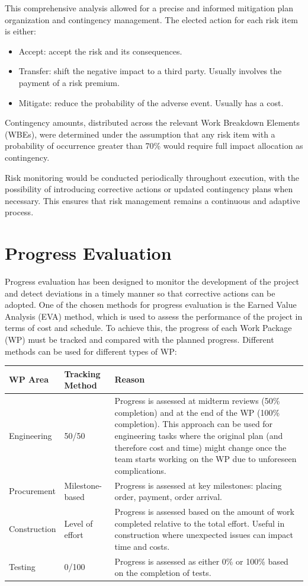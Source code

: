 This comprehensive analysis allowed for a precise and informed mitigation plan organization and contingency management.
The elected action for each risk item is either:
\begin{itemize}
    \item Accept: accept the risk and its consequences.
    \item Transfer: shift the negative impact to a third party. Usually involves the payment of a risk premium.
    \item Mitigate: reduce the probability of the adverse event. Usually has a cost.
\end{itemize}

Contingency amounts, distributed across the relevant Work Breakdown Elements (WBEs), were determined under the assumption that any risk item with a probability of occurrence greater than 70\% would require full impact allocation as contingency.

Risk monitoring would be conducted periodically throughout execution, with the possibility of introducing corrective actions or updated contingency plans when necessary. This ensures that risk management remains a continuous and adaptive process.

\section{Progress Evaluation}
Progress evaluation has been designed to monitor the development of the project and detect deviations in a timely manner so that corrective actions can be adopted. One of the chosen methods for progress evaluation is the Earned Value Analysis (EVA) method, which is used to assess the performance of the project in terms of cost and schedule. To achieve this, the progress of each Work Package (WP) must be tracked and compared with the planned progress. Different methods can be used for different types of WP:

\begin{table}[ht]
\centering
\begin{tabular}{|p{10em}|p{10em}|p{20em}|}
\hline
\textbf{WP Area} & \textbf{Tracking Method} & \textbf{Reason} \\
\hline
Engineering & 50/50 & Progress is assessed at midterm reviews (50\% completion) and at the end of the WP (100\% completion). This approach can be used for engineering tasks where the original plan (and therefore cost and time) might change once the team starts working on the WP due to unforeseen complications. \\
\hline
Procurement & Milestone-based & Progress is assessed at key milestones: placing order, payment, order arrival. \\
\hline
Construction & Level of effort & Progress is assessed based on the amount of work completed relative to the total effort. Useful in construction where unexpected issues can impact time and costs. \\
\hline
Testing & 0/100 & Progress is assessed as either 0\% or 100\% based on the completion of tests. \\
\hline
\end{tabular}
\end{table}

